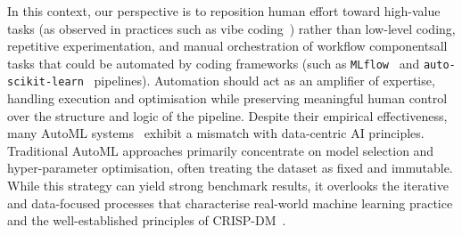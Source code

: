 \documentclass[runningheads]{llncs}
\begin{document}
In this context,
our perspective is to reposition human effort toward high-value tasks
(as observed in practices such as vibe coding~\cite{welsh2022end})
rather than low-level coding,
repetitive experimentation,
and manual orchestration of workflow components\textemdash{}all tasks that could be automated by coding frameworks
(such as \texttt{MLflow}~\cite{zaharia2018accelerating} and \texttt{auto-scikit-learn}~\cite{DBLP:journals/jmlr/FeurerEFLH22} pipelines).
%
Automation should act as an amplifier of expertise,
handling execution and optimisation while preserving meaningful human control over the structure and logic of the pipeline.
%
Despite their empirical effectiveness, many \ac{AutoML} systems~\cite{zha2025data} exhibit a mismatch with data-centric \ac{AI} principles.
%
Traditional \ac{AutoML} approaches primarily concentrate on model selection and hyper-parameter optimisation,
often treating the dataset as fixed and immutable.
%
While this strategy can yield strong benchmark results,
it overlooks the iterative and data-focused processes that characterise real-world machine learning practice and the well-established principles of CRISP-DM~\cite{schroer2021systematic}.


\end{document}
